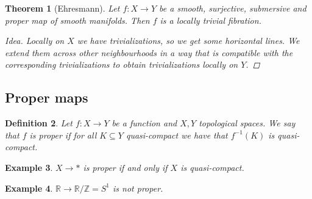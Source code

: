 \documentclass[12pt]{article}
\theoremstyle{darkgreentheorem}
\newtheorem{thm}{Theorem}[section]
\theoremstyle{darkbluedefinition}
\newtheorem{defn}[thm]{Definition}
\theoremstyle{darkredexample}
\newtheorem{exa}[thm]{Example}
\theoremstyle{remark}
\newcommand{\Z}{\mathbb{Z}}
\newcommand{\R}{\mathbb{R}}
\newcommand{\1}{\mathbbm{1}}
\newcommand{\sub}{\subseteq}
\begin{document}
\begin{thm}[Ehresmann]
    Let $f\colon X\to Y$ be a smooth, surjective, submersive and proper map of smooth manifolds.
    Then $f$ is a locally trivial fibration.
    \begin{proof}[Idea]
	Locally on $X$ we have trivializations, so we get some horizontal lines.
	We extend them across other neighbourhoods in a way that is compatible with the corresponding trivializations to obtain trivializations locally on $Y$.
    \end{proof}
\end{thm}

\subsection{Proper maps}

\begin{defn}
    Let $f\colon X\to Y$ be a function and $X,Y$ topological spaces.
    We say that $f$ is \textit{proper} if for all $K\sub Y$ quasi-compact we have that $f^{-1}(K)$ is quasi-compact.
\end{defn}

\begin{exa}
    $X\to *$ is proper if and only if $X$ is quasi-compact.
\end{exa}

\begin{exa}
    $\R\to \R/\Z=S^{1}$ is not proper.
\end{exa}
\end{document}
